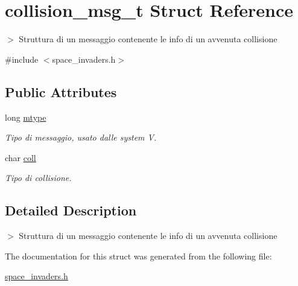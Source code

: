 \hypertarget{structcollision__msg__t}{
\section{collision\_\-msg\_\-t Struct Reference}
\label{structcollision__msg__t}
}


$>$ Struttura di un messaggio contenente le info di un avvenuta collisione  




{\ttfamily \#include $<$space\_\-invaders.h$>$}

\subsection*{Public Attributes}
\begin{DoxyCompactItemize}
\item 
\hypertarget{structcollision__msg__t_a2f02543b69915642814111fd58cbbadf}{
long \hyperlink{structcollision__msg__t_a2f02543b69915642814111fd58cbbadf}{mtype}}
\label{structcollision__msg__t_a2f02543b69915642814111fd58cbbadf}

\begin{DoxyCompactList}\small\item\em Tipo di messaggio, usato dalle system V. \item\end{DoxyCompactList}\item 
\hypertarget{structcollision__msg__t_aa73e9d0073cc6dc1370f8c47f8e86696}{
char \hyperlink{structcollision__msg__t_aa73e9d0073cc6dc1370f8c47f8e86696}{coll}}
\label{structcollision__msg__t_aa73e9d0073cc6dc1370f8c47f8e86696}

\begin{DoxyCompactList}\small\item\em Tipo di collisione. \item\end{DoxyCompactList}\end{DoxyCompactItemize}


\subsection{Detailed Description}
$>$ Struttura di un messaggio contenente le info di un avvenuta collisione 

The documentation for this struct was generated from the following file:\begin{DoxyCompactItemize}
\item 
\hyperlink{space__invaders_8h}{space\_\-invaders.h}\end{DoxyCompactItemize}
